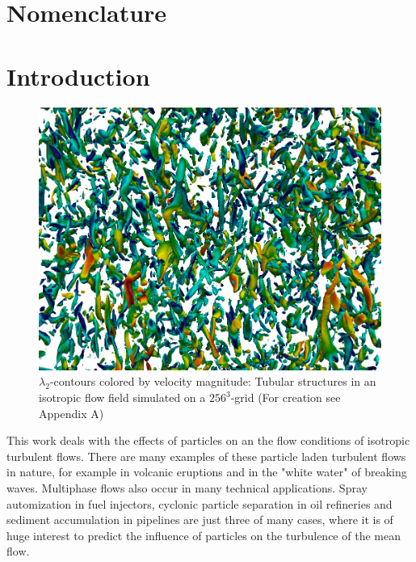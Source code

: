 \documentclass[11pt,a4paper,openany,oneside,parskip=half*]{article}
\begin{document}
\makenomenclature %

\renewcommand{\refname}{}
\renewcommand{\nomname}{}



\setlength{\columnsep}{30pt}
\setlength{\parindent}{0pt}

\pagebreak

\tableofcontents{} %
 
\pagebreak

\section{Nomenclature}
\printnomenclature
\pagebreak
\section{Introduction}
\begin{figure}[h]
	\centering
  \includegraphics[width=\textwidth]{./Abbildungen/256_velocity_4.png}
	\caption{$\lambda_\mathrm{2}$-contours colored by velocity magnitude: Tubular structures in an isotropic flow field simulated on a $256^3$-grid (For creation see Appendix A)}
	\label{introuction_picture}
\end{figure}
This work deals with the effects of particles on an the flow conditions of isotropic turbulent flows.
There are many examples of these particle laden turbulent flows in nature, for example in volcanic eruptions and in the "white water" of breaking waves.
\newline
Multiphase flows also occur in many technical applications. Spray automization in fuel injectors, cyclonic particle separation in oil refineries and sediment accumulation in pipelines are just three of many cases, where it is of huge interest to predict the influence of particles on the turbulence of the mean flow.
\end{document}
